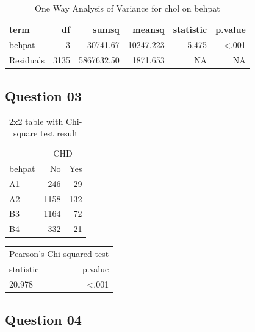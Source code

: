 \documentclass[
  12pt,
  oneside]{article}
\begin{document}
\begin{table}[H]

\caption{\label{tab:Table-03}One Way Analysis of Variance for chol on behpat}
\centering
\begin{tabular}[t]{lrrrrr}
\toprule
term & df & sumsq & meansq & statistic & p.value\\
\midrule
behpat & 3 & 30741.67 & 10247.223 & 5.475 & <.001\\
Residuals & 3135 & 5867632.50 & 1871.653 & NA & NA\\
\bottomrule
\end{tabular}
\end{table}

\hypertarget{question-03}{%
\subsection{Question 03}\label{question-03}}

\begin{table}[H]

\caption{\label{tab:Table-04}2x2 table with Chi-square test result}
\centering
\begin{tabular}[t]{lrr}
\toprule
\multicolumn{1}{c}{ } & \multicolumn{2}{c}{CHD} \\
\cmidrule(l{3pt}r{3pt}){2-3}
behpat & No & Yes\\
\midrule
A1 & 246 & 29\\
A2 & 1158 & 132\\
B3 & 1164 & 72\\
B4 & 332 & 21\\
\bottomrule
\end{tabular}
\end{table}

\begin{table}[H]
\centering
\begin{tabular}{lr}
\toprule
\multicolumn{2}{c}{Pearson's Chi-squared test} \\
\cmidrule(l{3pt}r{3pt}){1-2}
statistic & p.value\\
\midrule
20.978 & <.001\\
\bottomrule
\end{tabular}
\end{table}

\hypertarget{question-04}{%
\subsection{Question 04}\label{question-04}}
\end{document}
